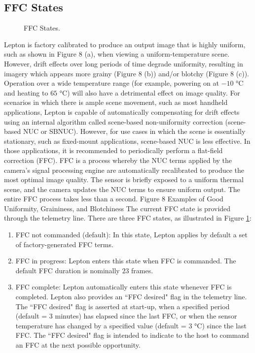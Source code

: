 \subsection{FFC States}
\label{ssec:FFCstates}
\begin{figure}[b]
    \centering
    \resizebox{0.80\textwidth}{!}{}
    \caption{FFC States.}
    \label{fig:FFC States}
\end{figure}
Lepton is factory calibrated to produce an output image that is highly uniform,
such as shown in Figure 8 (a), when viewing a uniform-temperature scene.
However, drift effects over long periods of time degrade uniformity, resulting
in imagery which appears more grainy (Figure 8 (b)) and/or blotchy (Figure 8
(c)). Operation over a wide temperature range (for example, powering on at $-10$
\si{\celsius} and heating to $65$ \si{\celsius}) will also have a detrimental
effect on image quality. For scenarios in which there is ample scene movement,
such as most handheld applications, Lepton is capable of automatically
compensating for drift effects using an internal algorithm called scene-based
non-uniformity correction (scene-based NUC or SBNUC). However, for use cases in
which the scene is essentially stationary, such as fixed-mount applications,
scene-based NUC is less effective. In those applications, it is recommended to
periodically perform a flat-field correction (FFC). FFC is a process whereby the
NUC terms applied by the camera's signal processing engine are automatically
recalibrated to produce the most optimal image quality. The sensor is briefly
exposed to a uniform thermal scene, and the camera updates the NUC terms to
ensure uniform output. The entire FFC process takes less than a second. Figure 8
Examples of Good Uniformity, Graininess, and Blotchiness The current FFC state
is provided through the telemetry line. There are three FFC states, as
illustrated in Figure \ref{fig:FFC States}:
\begin{enumerate}
    \item FFC not commanded (default): In this state, Lepton applies by default a
set of factory-generated FFC terms.
    \item FFC in progress: Lepton enters this
state when FFC is commanded. The default FFC duration is nominally $23$ frames.
    \item FFC complete: Lepton automatically enters this state whenever FFC is
completed. Lepton also provides an ``FFC desired" flag in the telemetry line.
The ``FFC desired" flag is asserted at start-up, when a specified period
(default = 3 minutes) has elapsed since the last FFC, or when the sensor
temperature has changed by a specified value (default = 3 \si{\celsius}) since
the last FFC. The ``FFC desired" flag is intended to indicate to the host to
command an FFC at the next possible opportunity.
\end{enumerate}

